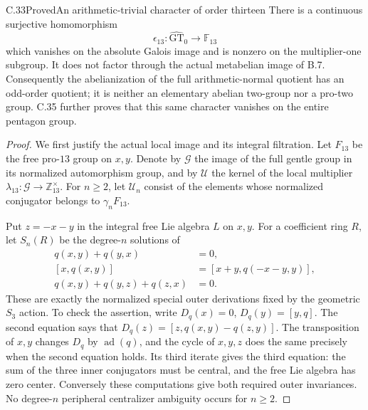 \begin{statement}{C.33}{Proved}{An arithmetic-trivial character of order thirteen}
There is a continuous surjective homomorphism
\[
 \epsilon_{13}:\widehat{\mathrm{GT}}_0\longrightarrow\mathbb F_{13}
\]
which vanishes on the absolute Galois image and is nonzero on the
multiplier-one subgroup.  It does not factor through the actual
metabelian image of B.7.  Consequently the abelianization of the full
arithmetic-normal quotient has an odd-order quotient; it is neither
an elementary abelian two-group nor a pro-two group.
C.35 further proves that this same character vanishes on the
entire pentagon group.
\end{statement}
\begin{proof}
We first justify the actual local image and its integral filtration.
Let $F_{13}$ be the free pro-$13$ group on $x,y$.  Denote by
$\mathcal G$ the image of the full gentle group in its normalized
automorphism group, and by $\mathcal U$ the kernel of the local
multiplier $\lambda_{13}:\mathcal G\to\mathbb Z_{13}^{\times}$.
For $n\geq2$, let $\mathcal U_n$ consist of the elements whose
normalized conjugator belongs to $\gamma_nF_{13}$.

Put $z=-x-y$ in the integral free Lie algebra $L$ on $x,y$.
For a coefficient ring $R$, let $S_n(R)$ be the degree-$n$ solutions of
\[
\begin{split}
 q(x,y)+q(y,x)&=0,\\
 [x,q(x,y)]&=[x+y,q(-x-y,y)],\\
 q(x,y)+q(y,z)+q(z,x)&=0.
\end{split}                                                    \tag{C33.1}
\]
These are exactly the normalized special outer derivations fixed
by the geometric $S_3$ action.  To check the assertion, write
$D_q(x)=0$, $D_q(y)=[y,q]$.  The second equation says that
$D_q(z)=[z,q(x,y)-q(z,y)]$.  The transposition of $x,y$
changes $D_q$ by $\operatorname{ad}(q)$, and the cycle of $x,y,z$
does the same precisely when the second equation holds.
Its third iterate gives the third equation: the sum of the three
inner conjugators must be central, and the free Lie algebra has
zero center.  Conversely these computations give both required
outer invariances.  No degree-$n$ peripheral centralizer ambiguity
occurs for $n\geq2$.


\end{proof}
